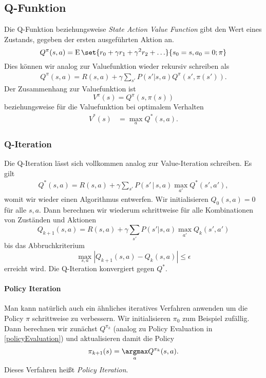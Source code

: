 \subsection{Q-Funktion}
Die Q-Funktion beziehungsweise \emph{State Action Value Function} gibt den Wert eines Zustands, gegeben der ersten ausgeführten Aktion an.
\begin{equation*}
	Q^\pi(s,a)=\E\set{r_0+\gamma r_1+\gamma^2 r_2+\ldots}{s_0=s,a_0=0;\pi}
\end{equation*}
Dies können wir analog zur Valuefunktion wieder rekursiv schreiben als
\begin{align*}
	Q^\pi(s,a)=R(s,a)+\gamma\sum_{s'}P(s'|s,a)Q^\pi(s',\pi(s')).
\end{align*}
Der Zusammenhang zur Valuefunktion ist
\begin{equation*}
	V^\pi(s)=Q^\pi(s,\pi(s))
\end{equation*}
beziehungsweise für die Valuefunktion bei optimalem Verhalten
\begin{align*}
	V^\ast(s)&=\max_aQ^\ast(s,a).
\end{align*}

\subsubsection{Q-Iteration}
Die Q-Iteration lässt sich vollkommen analog zur Value-Iteration schreiben. Es gilt 
\begin{align*}
	Q^\ast(s,a)=R(s,a)+\gamma\sum_{s'}P(s'\,|\,s,a)\max_{a'}Q^\ast (s',a'),
\end{align*}
womit wir wieder einen Algorithmus entwerfen.
Wir initialisieren $Q_0(s,a)=0$ für alle $s,a$.
Dann berechnen wir wiederum schrittweise für alle Kombinationen von Zuständen und Aktionen
\begin{equation*}
	Q_{k+1}(s,a)=R(s,a)+\gamma\sum_{s'}P(s'|s,a)\max_{a'}Q_{k}(s',a')
\end{equation*}
bis das Abbruchkriterium 
\begin{equation*}
	\max_{s,a}|Q_{k+1}(s,a)-Q_k(s,a)|\leq \epsilon
\end{equation*}
erreicht wird.
Die Q-Iteration konvergiert gegen $Q^\ast$.

\paragraph{Policy Iteration}
Man kann natürlich auch ein ähnliches iteratives Verfahren anwenden um die Policy $\pi$ schrittweise zu verbessern.
Wir initialisieren $\pi_0$ zum Beispiel zufällig.
Dann berechnen wir zunächst $Q^{\pi_k}$ (analog zu Policy Evaluation in \autoref{policyEvaluation}) und aktualisieren damit die Policy
\begin{equation*}
	\pi_{k+1}(s)=\underset a\argmax Q^{\pi_k}(s,a).
\end{equation*}
Dieses Verfahren heißt \emph{Policy Iteration}.



